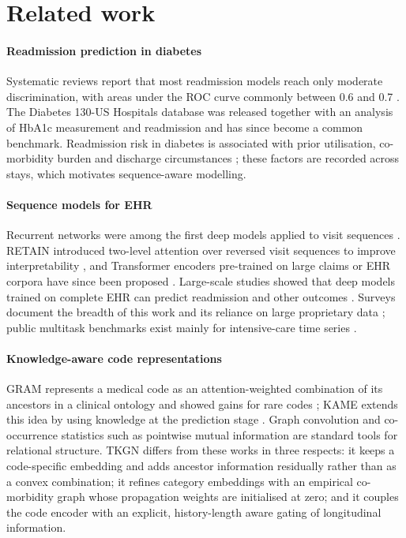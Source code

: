 \documentclass[preprint,12pt,authoryear]{elsarticle}
\begin{document}
\section{Related work}
\label{sec:related}

\paragraph{Readmission prediction in diabetes}
Systematic reviews report that most readmission models reach only
moderate discrimination, with areas under the ROC curve commonly between
0.6 and 0.7 \citep{kansagara2011}. The Diabetes 130-US Hospitals database
was released together with an analysis of HbA1c measurement and
readmission \citep{strack2014} and has since become a common benchmark.
Readmission risk in diabetes is associated with prior utilisation,
co-morbidity burden and discharge circumstances \citep{rubin2015}; these
factors are recorded across stays, which motivates sequence-aware
modelling.

\paragraph{Sequence models for EHR}
Recurrent networks were among the first deep models applied to visit
sequences \citep{choi2016doctorai}. RETAIN introduced two-level attention
over reversed visit sequences to improve interpretability
\citep{choi2016retain}, and Transformer encoders pre-trained on large
claims or EHR corpora have since been proposed
\citep{li2020behrt,rasmy2021medbert}. Large-scale studies showed that deep
models trained on complete EHR can predict readmission and other outcomes
\citep{rajkomar2018}. Surveys document the breadth of this work and its
reliance on large proprietary data \citep{shickel2018deepehr}; public
multitask benchmarks exist mainly for intensive-care time series
\citep{harutyunyan2019}.

\paragraph{Knowledge-aware code representations}
GRAM represents a medical code as an attention-weighted combination of
its ancestors in a clinical ontology and showed gains for rare codes
\citep{choi2017gram}; KAME extends this idea by using knowledge at the
prediction stage \citep{ma2018kame}. Graph convolution
\citep{kipf2017} and co-occurrence statistics such as pointwise mutual
information \citep{church1990} are standard tools for relational
structure. TKGN differs from these works in three respects: it keeps a
code-specific embedding and adds ancestor information residually rather
than as a convex combination; it refines category embeddings with an
empirical co-morbidity graph whose propagation weights are initialised at
zero; and it couples the code encoder with an explicit, history-length
aware gating of longitudinal information.
\end{document}
